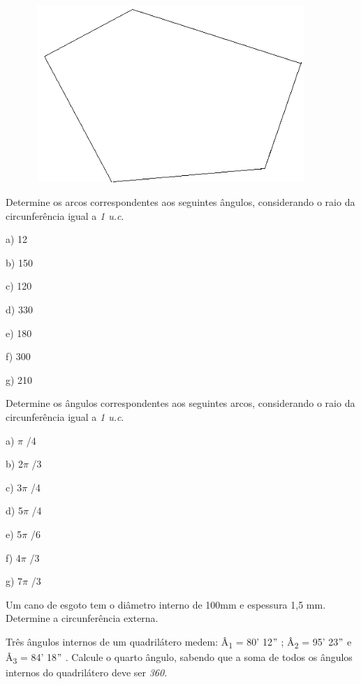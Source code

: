 \begin{exercicios}
\begin{figure}[H]
    \begin{Center}
        \includegraphics[width=4.09in,height=2.64in]{capitulos/trigonometria_e_funcoes_trigonometricas/media/image7.png}
    \end{Center}
\end{figure}

\exitem{} Determine os arcos correspondentes aos seguintes ângulos, considerando o raio da circunferência igual a \textit{1 u.c}.

a) 12\degree

b) 150\degree

c) 120\degree

d) 330\degree

e) 180\degree

f) 300\degree

g) 210\degree

\exitem{} Determine os ângulos correspondentes aos seguintes arcos, considerando o raio da circunferência igual a \textit{1 u.c}.

a) $ \pi $ /4

b) 2$ \pi $ /3

c) 3$ \pi $ /4

d) 5$ \pi $ /4

e) 5$ \pi $ /6

f) 4$ \pi $ /3

g) 7$ \pi $ /3

\exitem{} Um cano de esgoto tem o diâmetro interno de 100mm e espessura 1,5 mm. Determine a circunferência externa.

\exitem{} Três ângulos internos de um quadrilátero medem: Â\textsubscript{1} = 80’ 12$"$   ; Â\textsubscript{2} = 95’ 23$"$   e   Â\textsubscript{3} = 84’ 18$"$ . Calcule o quarto ângulo, sabendo que a soma de todos os ângulos internos do quadrilátero deve ser  \textit{360\degree . }


\end{exercicios}
